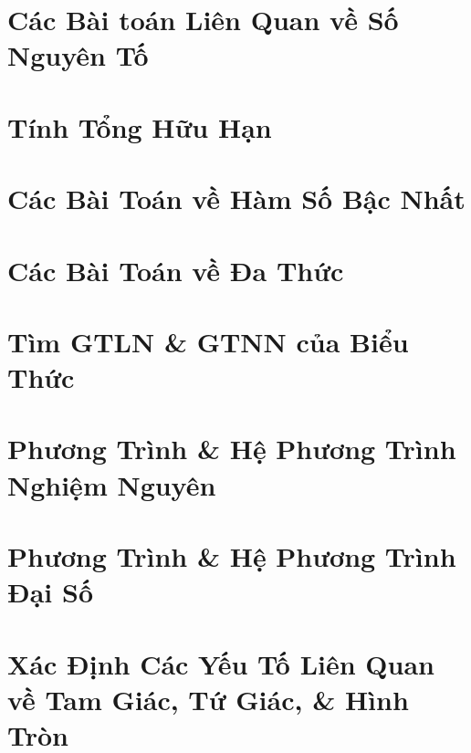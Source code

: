 \documentclass{article}
\begin{document}
\section{Các Bài toán Liên Quan về Số Nguyên Tố}


\section{Tính Tổng Hữu Hạn}


\section{Các Bài Toán về Hàm Số Bậc Nhất}


\section{Các Bài Toán về Đa Thức}


\section{Tìm GTLN \& GTNN của Biểu Thức}


\section{Phương Trình \& Hệ Phương Trình Nghiệm Nguyên}


\section{Phương Trình \& Hệ Phương Trình Đại Số}


\section{Xác Định Các Yếu Tố Liên Quan về Tam Giác, Tứ Giác, \& Hình Tròn}
\end{document}
